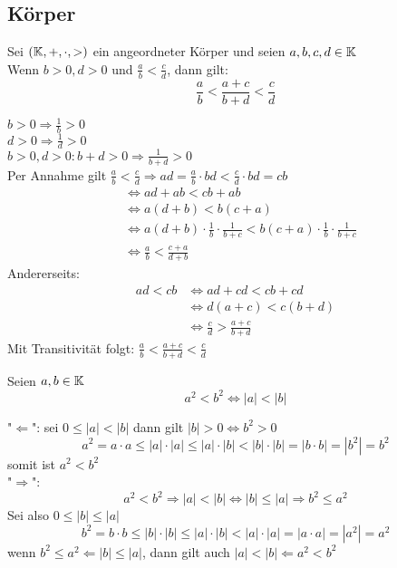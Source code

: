 \documentclass[../ana1u.tex]{subfiles}
\begin{document}
\subsection{Körper}
\begin{satz}
    Sei \((\mathbb{K},+,\cdot, >)\) ein angeordneter Körper und seien \(a,b,c,d \in \mathbb{K}\)\\
    Wenn \(b > 0, d > 0\) und \(\frac{a}{b} < \frac{c}{d}\), dann gilt:
    \[\frac{a}{b} < \frac{a+c}{b + d} < \frac{c}{d}\]
\end{satz}
\begin{bew}
    \(b > 0 \Rightarrow \frac{1}{b} > 0\)\\
    \(d > 0 \Rightarrow \frac{1}{d} > 0\)\\
    \(b > 0, d > 0: b+d > 0 \Rightarrow \frac{1}{b+d} > 0\)\\
    Per Annahme gilt \(\frac{a}{b} < \frac{c}{d} \Rightarrow ad = \frac{a}{b} \cdot bd 
    < \frac{c}{d} \cdot bd = cb\)
    \begin{align*}
        &\Leftrightarrow ad + ab < cb + ab\\
        &\Leftrightarrow a(d+b) < b(c+a)\\
        &\Leftrightarrow a(d+b) \cdot \frac{1}{b} \cdot \frac{1}{b+c} < b(c+a) \cdot 
        \frac{1}{b} \cdot \frac{1}{b+c}\\
        &\Leftrightarrow \frac{a}{b} < \frac{c+a}{d+b}
    \end{align*}
    Andererseits:
    \begin{align*}
        ad < cb &\Leftrightarrow ad + cd < cb + cd\\
        &\Leftrightarrow d(a+c) < c(b+d)\\
        &\Leftrightarrow \frac{c}{d} > \frac{a+c}{b+d}
    \end{align*}
    Mit Transitivität folgt: \(\frac{a}{b} < \frac{a+c}{b + d} < \frac{c}{d}\)
\end{bew}
\begin{satz}
    Seien \(a,b \in \mathbb{K}\)
    \[a^2 < b^2 \Leftrightarrow |a| < |b|\]
\end{satz}
\begin{bew}
    "\(\Leftarrow \)": sei \(0 \leq |a| < |b|\) dann gilt \(|b| > 0 \Leftrightarrow b^2 > 0\)
    \[a^2 = a \cdot a \leq |a| \cdot |a| \leq |a| \cdot |b| < |b| \cdot |b| = |b \cdot b|
     = |b^2| = b^2 \]
    somit ist \(a^2 < b^2\)\\
    "\(\Rightarrow\)":
    \[a^2 < b^2 \Rightarrow |a| < |b| \Leftrightarrow |b| \leq |a| \Rightarrow b^2 \leq a^2 \]
    Sei also \(0 \leq |b| \leq |a|\)
    \[b^2 = b \cdot b \leq |b| \cdot |b| \leq |a| \cdot |b| < |a| \cdot |a| = |a \cdot a| 
    = |a^2| = a^2\]
    wenn \(b^2 \leq a^2 \Leftarrow |b| \leq |a|\), dann gilt auch \(|a| < |b| \Leftarrow a^2 
    < b^2\)
\end{bew}
\end{document}
